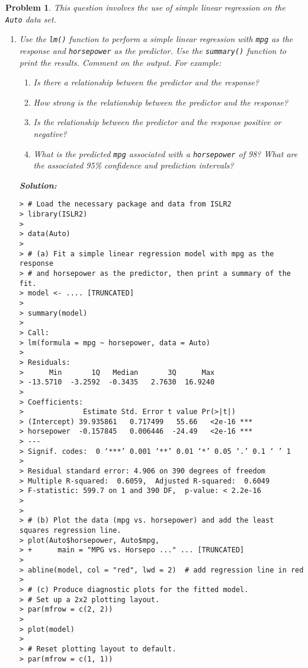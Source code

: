 \documentclass[12pt]{article}
\newtheorem{problem}{Problem} %
\theoremstyle{definition}
\newcommand{\solution}{\textcolor{PineGreen}{\textbf{Solution:}}\newline}
\begin{document}
\bigskip

\setcounter{problem}{7}

\begin{problem}
This question involves the use of simple linear regression on the \texttt{Auto} data set.

\begin{enumerate}[label=(\alph*)]
    \item Use the \texttt{lm()} function to perform a simple linear regression with \texttt{mpg} as the response and \texttt{horsepower} as the predictor. Use the \texttt{summary()} function to print the results. Comment on the output. For example:
    \begin{enumerate}[label=\roman*.]
        \item Is there a relationship between the predictor and the response?
        \item How strong is the relationship between the predictor and the response?
        \item Is the relationship between the predictor and the response positive or negative?
        \item What is the predicted \texttt{mpg} associated with a \texttt{horsepower} of 98? What are the associated 95\% confidence and prediction intervals?
    \end{enumerate}
    

    \solution
    
    \begin{lstlisting}[frame=single, caption={Terminal Output for Problem 8(a)}]
> # Load the necessary package and data from ISLR2
> library(ISLR2)
> 
> data(Auto)
> 
> # (a) Fit a simple linear regression model with mpg as the response
> # and horsepower as the predictor, then print a summary of the fit.
> model <- .... [TRUNCATED] 
> 
> summary(model)
> 
> Call:
> lm(formula = mpg ~ horsepower, data = Auto)
> 
> Residuals:
>      Min       1Q   Median       3Q      Max 
> -13.5710  -3.2592  -0.3435   2.7630  16.9240 
> 
> Coefficients:
>              Estimate Std. Error t value Pr(>|t|)    
> (Intercept) 39.935861   0.717499   55.66   <2e-16 ***
> horsepower  -0.157845   0.006446  -24.49   <2e-16 ***
> ---
> Signif. codes:  0 ‘***’ 0.001 ‘**’ 0.01 ‘*’ 0.05 ‘.’ 0.1 ‘ ’ 1
> 
> Residual standard error: 4.906 on 390 degrees of freedom
> Multiple R-squared:  0.6059,	Adjusted R-squared:  0.6049 
> F-statistic: 599.7 on 1 and 390 DF,  p-value: < 2.2e-16
> 
> 
> # (b) Plot the data (mpg vs. horsepower) and add the least squares regression line.
> plot(Auto$horsepower, Auto$mpg,
> +      main = "MPG vs. Horsepo ..." ... [TRUNCATED] 
> 
> abline(model, col = "red", lwd = 2)  # add regression line in red
> 
> # (c) Produce diagnostic plots for the fitted model.
> # Set up a 2x2 plotting layout.
> par(mfrow = c(2, 2))
> 
> plot(model)
> 
> # Reset plotting layout to default.
> par(mfrow = c(1, 1))
    \end{lstlisting}
    

\end{enumerate}
\end{problem}
\end{document}
